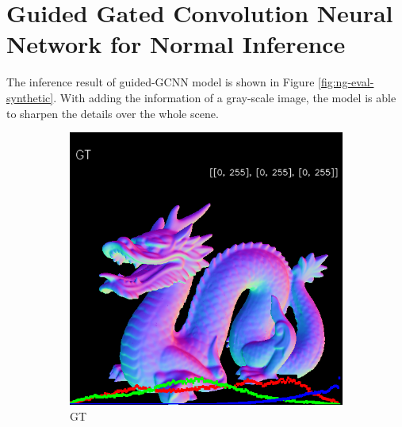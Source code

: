 \section{Guided Gated Convolution Neural Network for Normal Inference }

The inference result of guided-GCNN model is shown in Figure \ref{fig:ng-eval-synthetic}. With adding the information of a gray-scale image, the model is able to sharpen the details over the whole scene. 

\begin{figure}[h!]
	\centering
	\begin{subfigure}[b]{0.19\linewidth}
		\includegraphics[width=\linewidth]{./Figures/ng-synthetic/fancy_eval_3_groundtruth.png}
		\caption{GT}
	\end{subfigure}
	\begin{subfigure}[b]{0.19\linewidth}

\end{subfigure}
\end{figure}
